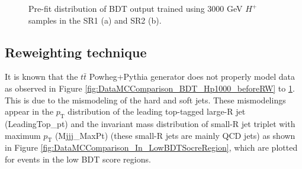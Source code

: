 \begin{figure}[H]
  \caption{Pre-fit distribution of BDT output trained using 3000 GeV $H^{+}$ samples in the SR1 (a) and SR2 (b).}
  \label{fig:DataMCComparison_BDT_Hp3000_beforeRW}
\end{figure}

\subsection{Reweighting technique}
\label{subsec:ReweightingTechnique}
It is known that the $t\bar{t}$ Powheg+Pythia generator does not properly model data as observed in Figure \ref{fig:DataMCComparison_BDT_Hp1000_beforeRW} to \ref{fig:DataMCComparison_BDT_Hp3000_beforeRW}. This is due to the mismodeling of the hard and soft jets. These mismodelings appear in the $p_\text{T}$ distribution of the leading top-tagged large-R jet (LeadingTop\_pt) and the invariant mass distribution of small-R jet triplet with maximum $p_{\text{T}}$ (Mjjj\_MaxPt) (these small-R jets are mainly QCD jets) as shown in Figure \ref{fig:DataMCComparison_In_LowBDTSocreRegion}, which are plotted for events in the low BDT score regions.

